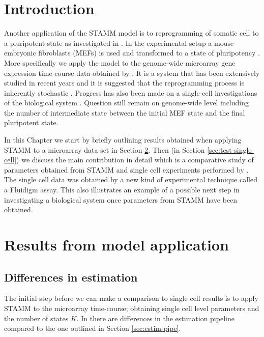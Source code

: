 \section{Introduction}
\label{sec:introduction-rep}

Another application of the STAMM model is to reprogramming of somatic cell to a pluripotent state as investigated in \cite{Armond:2013}. In the experimental setup a mouse embryonic fibroblasts (MEFs) is used and transformed to a state of pluripotency \citep{Takahashi:2006hi,Jaenisch:2008cz}. More specifically we apply the model to the genome-wide microarray gene expression time-course data obtained by \cite{SamavarchiTehrani:2010cp}. It is a system that has been extensively studied in recent years and it is suggested that the reprogramming process is inherently stochastic \citep{Hanna:2009ix}. Progress has also been made on a single-cell investigations of the biological system \citep{Buganim:2012hp}. Question still remain on genome-wide level including the number of intermediate state between the initial MEF state and the final pluripotent state. 

In this Chapter we start by briefly outlining results obtained \cite{Armond:2013} when applying STAMM to a microarray data set in Section \ref{sec:iPsc-results}. Then (in Section \ref{sec:test-single-cell}) we discuss the main contribution in detail which is a comparative study of parameters obtained from STAMM and single cell experiments performed by \cite{Buganim:2012hp}. The single cell data was obtained by a new kind of experimental technique called a Fluidigm assay. This also illustrates an example of a possible next step in investigating a biological system once parameters from STAMM have been obtained. 

\section{Results from model application}
\label{sec:iPsc-results}

\subsection{Differences in estimation}
\label{sec:diff-estim}

The initial step before we can make a comparison to single cell results is to apply STAMM to the microarray time-course; obtaining single cell level parameters and the number of states $K$. In  \cite{Armond:2013} there are differences in the estimation pipeline compared to the one outlined in Section \ref{sec:estim-pipe}.

